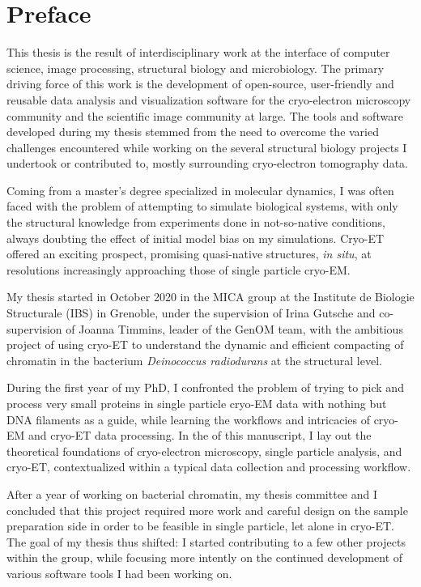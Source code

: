 \chapter{Preface}

This thesis is the result of interdisciplinary work at the interface of computer science, image processing, structural biology and microbiology.
The primary driving force of this work is the development of open-source, user-friendly and reusable data analysis and visualization software for the cryo-electron microscopy community and the scientific image community at large.
The tools and software developed during my thesis stemmed from the need to overcome the varied challenges encountered while working on the several structural biology projects I undertook or contributed to, mostly surrounding cryo-electron tomography data.

Coming from a master's degree specialized in molecular dynamics, I was often faced with the problem of attempting to simulate biological systems, with only the structural knowledge from experiments done in not-so-native conditions, always doubting the effect of initial model bias on my simulations.
Cryo-ET offered an exciting prospect, promising quasi-native structures, \textit{in situ}, at resolutions increasingly approaching those of single particle cryo-EM.

My thesis started in October 2020 in the MICA group at the Institute de Biologie Structurale (IBS) in Grenoble, under the supervision of Irina Gutsche and co-supervision of Joanna Timmins, leader of the GenOM team, with the ambitious project of using cryo-ET to understand the dynamic and efficient compacting of chromatin in the bacterium \textit{Deinococcus radiodurans} at the structural level.

During the first year of my PhD, I confronted the problem of trying to pick and process very small proteins in single particle cryo-EM data with nothing but DNA filaments as a guide, while learning the workflows and intricacies of cryo-EM and cryo-ET data processing.
In the  of this manuscript, I lay out the theoretical foundations of cryo-electron microscopy, single particle analysis, and cryo-ET, contextualized within a typical data collection and processing workflow.

After a year of working on bacterial chromatin, my thesis committee and I concluded that this project required more work and careful design on the sample preparation side in order to be feasible in single particle, let alone in cryo-ET.
The goal of my thesis thus shifted: I started contributing to a few other projects within the group, while focusing more intently on the continued development of various software tools I had been working on.

